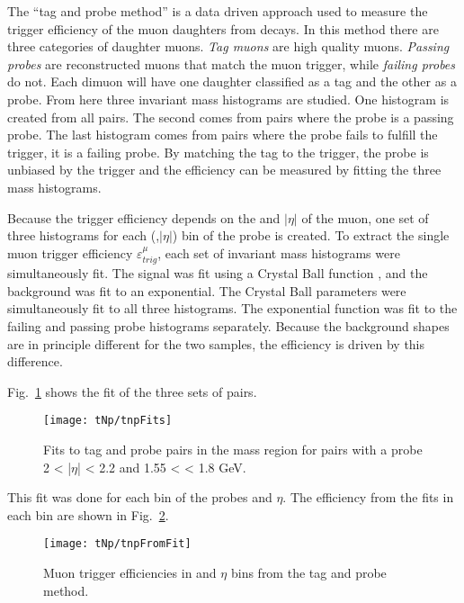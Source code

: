       The ``tag and probe method'' is a data driven approach used to measure the 
        trigger efficiency of the muon daughters from \JPsi{} decays.
      In this method there are three categories of daughter muons. 
      \textit{Tag muons} are high quality muons.
      \textit{Passing probes} are reconstructed muons that match the muon 
        trigger, while \textit{failing probes} do not. 
      Each dimuon will have one daughter classified as a tag and the other
        as a probe.
      From here three invariant mass histograms are studied. 
      One histogram is created from all pairs. 
      The second comes from pairs where the probe is a passing probe.  
      The last histogram comes from pairs where the probe fails to fulfill
        the trigger, it is a failing probe. 
      By matching the tag to the trigger, the probe is unbiased by the trigger 
        and the  efficiency can be measured by fitting the three mass 
        histograms. 

      Because the trigger efficiency depends on the \pt{} and $|\eta|$ of the 
        muon, one set of three histograms for each (\pt{},$|\eta|$) bin of the
        probe is created.
      To extract the single muon trigger efficiency $\varepsilon^{\mu}_{trig}$, 
        each set of invariant mass histograms were simultaneously fit. 
      The signal was fit using a Crystal Ball function \cite{Gaiser:1982yw}, and the background 
        was fit to an exponential.
      The Crystal Ball parameters were simultaneously fit to all three 
        histograms.
      The exponential function was fit to the failing and passing probe 
        histograms separately.
      Because the background shapes are in principle different for the two 
        samples, the efficiency is driven by this difference. 

      Fig.~\ref{fig:tnpFitPlot} shows the fit of the three sets of pairs. 
      \begin{figure}[!Hh]
        \centering
        \texttt{[image: tNp/tnpFits]}
        \caption{Fits to tag and probe pairs in the \JPsi{} mass region for
        pairs with a probe 2 < |$\eta$| < 2.2 and 1.55 < \pt{} < 1.8 GeV.}
        \label{fig:tnpFitPlot}
      \end{figure}
      This fit was done for each bin of the probes \pt{} and $\eta$.
      The efficiency from the fits in each bin are shown in Fig.~\ref{fig:tnpTrigMap}.
      \begin{figure}[!Hhbt]
        \centering
        \texttt{[image: tNp/tnpFromFit]}
        \caption{Muon trigger efficiencies in \pt{} and $\eta$ bins from 
          the tag and probe method.}
        \label{fig:tnpTrigMap}
      \end{figure}

